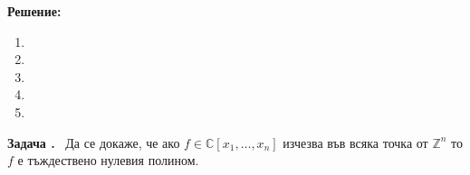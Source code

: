 \documentclass[a4paper,12pt,fleqn]{article}
\newcounter{problem}
\newcommand\problem{%
  \stepcounter{problem}%
  \textbf{Задача \theproblem.}~%
}
\newcommand\solution{%
  \textbf{Решение:}~%
}
\begin{document}
    \solution{
        \begin{enumerate}
                \item 
                \begin{minipage}[t]{\linewidth}
                    \raggedright
                \end{minipage}
                \item 
                \begin{minipage}[t]{\linewidth}
                    \raggedright
                \end{minipage}
                \item 
                \begin{minipage}[t]{\linewidth}
                    \raggedright
                \end{minipage}
                \item 
                \begin{minipage}[t]{\linewidth}
                    \raggedright
                \end{minipage}
                \item 
                \begin{minipage}[t]{\linewidth}
                    \raggedright
                \end{minipage}
        \end{enumerate} 
    }

    \problem{
        Да се докаже, че ако \( f \in \mathbb{C}\left[ x_{1},\dots,x_{n} \right] \) изчезва във всяка точка от \( \mathbb{Z}^{n} \) то \( f \) е тъждествено нулевия полином.
    }
\end{document}
